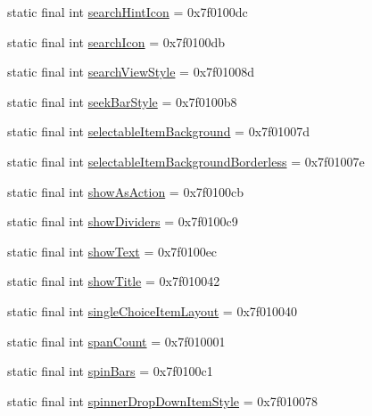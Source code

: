 \begin{CompactItemize}
\item 
static final int \hyperlink{classandroid_1_1support_1_1v7_1_1palette_1_1_r_1_1attr_39b0c88d0bd28f66810ac2fcc23da6f0}{searchHintIcon} = 0x7f0100dc
\item 
static final int \hyperlink{classandroid_1_1support_1_1v7_1_1palette_1_1_r_1_1attr_14bf5080819d4ef9138460911b2a6b76}{searchIcon} = 0x7f0100db
\item 
static final int \hyperlink{classandroid_1_1support_1_1v7_1_1palette_1_1_r_1_1attr_bae6f725d94932015652b17ac9a50a74}{searchViewStyle} = 0x7f01008d
\item 
static final int \hyperlink{classandroid_1_1support_1_1v7_1_1palette_1_1_r_1_1attr_096d898093a4821257a4ab0c63b4bd77}{seekBarStyle} = 0x7f0100b8
\item 
static final int \hyperlink{classandroid_1_1support_1_1v7_1_1palette_1_1_r_1_1attr_2152a95ffa6aa13a1f78ca77517b566f}{selectableItemBackground} = 0x7f01007d
\item 
static final int \hyperlink{classandroid_1_1support_1_1v7_1_1palette_1_1_r_1_1attr_c3e9dc2e2b988e2843ffb17f31ee9eb4}{selectableItemBackgroundBorderless} = 0x7f01007e
\item 
static final int \hyperlink{classandroid_1_1support_1_1v7_1_1palette_1_1_r_1_1attr_39d56b31baae0112ca355baf7de9d0ad}{showAsAction} = 0x7f0100cb
\item 
static final int \hyperlink{classandroid_1_1support_1_1v7_1_1palette_1_1_r_1_1attr_c347212a0afb03e44f4df1bb0d80b87a}{showDividers} = 0x7f0100c9
\item 
static final int \hyperlink{classandroid_1_1support_1_1v7_1_1palette_1_1_r_1_1attr_2b1dbcc7ac1a936a9fdcea50a8443dc6}{showText} = 0x7f0100ec
\item 
static final int \hyperlink{classandroid_1_1support_1_1v7_1_1palette_1_1_r_1_1attr_6b3d4fa231e762889e4762967b0ac9ca}{showTitle} = 0x7f010042
\item 
static final int \hyperlink{classandroid_1_1support_1_1v7_1_1palette_1_1_r_1_1attr_d4aef36297d23e4be9b7a2e8b1496b20}{singleChoiceItemLayout} = 0x7f010040
\item 
static final int \hyperlink{classandroid_1_1support_1_1v7_1_1palette_1_1_r_1_1attr_b6231987c081cfbc5b906ca5f2b938ab}{spanCount} = 0x7f010001
\item 
static final int \hyperlink{classandroid_1_1support_1_1v7_1_1palette_1_1_r_1_1attr_cdbff5e97a9d0345b63f76af63797652}{spinBars} = 0x7f0100c1
\item 
static final int \hyperlink{classandroid_1_1support_1_1v7_1_1palette_1_1_r_1_1attr_e32c94e0b925844877823580ca63733b}{spinnerDropDownItemStyle} = 0x7f010078

\end{CompactItemize}

